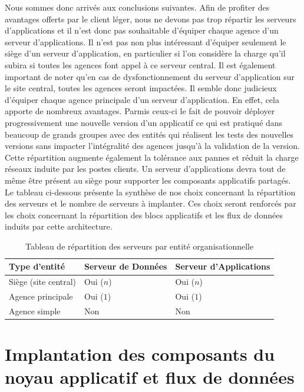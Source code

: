 Nous sommes donc arrivés aux conclusions suivantes. Afin de profiter des avantages offerts par le client léger, nous ne devons pas trop répartir les serveurs d'applications et il n'est donc pas souhaitable d'équiper chaque agence d'un serveur d'applications. Il n'est pas non plus intéressant d'équiper seulement le siège d'un serveur d'application, en particulier si l'on considère la charge qu'il subira si toutes les agences font appel à ce serveur central. Il est également important de noter qu'en cas de dysfonctionnement du serveur d'application sur le site central, toutes les agences seront impactées. Il semble donc judicieux d'équiper chaque agence principale d'un serveur d'application. En effet, cela apporte de nombreux avantages. Parmis ceux-ci le fait de pouvoir déployer progressivement une nouvelle version d'un applicatif ce qui est pratiqué dans beaucoup de grands groupes avec des entités qui réalisent les tests des nouvelles versions sans impacter l'intégralité des agences jusqu'à la validation de la version. Cette répartition augmente également la tolérance aux pannes et réduit la charge réseaux induite par les postes clients. Un serveur d'applications devra tout de même être présent au siège pour supporter les composants applicatifs partagés.\\

Le tableau ci-dessous présente la synthèse de nos choix concernant la répartition des serveurs et le nombre de serveurs à implanter. Ces choix seront renforcés par les choix concernant la répartition des blocs applicatifs et les flux de données induits par cette architecture. 


\begin{table}[H]
    \centering
    \begin{tabular}{l|l|l}
    Type d'entité        & Serveur de Données & Serveur d'Applications \\ \hline
    Siège (site central) & Oui ($n$)            & Oui ($n$)                \\
    Agence principale    & Oui ($1$)            & Oui ($1$)                \\
    Agence simple        & Non                & Non                    \\
    \end{tabular}
    \caption{Tableau de répartition des serveurs par entité organisationnelle}
\end{table}

\section{Implantation des composants du noyau applicatif et flux de données}

